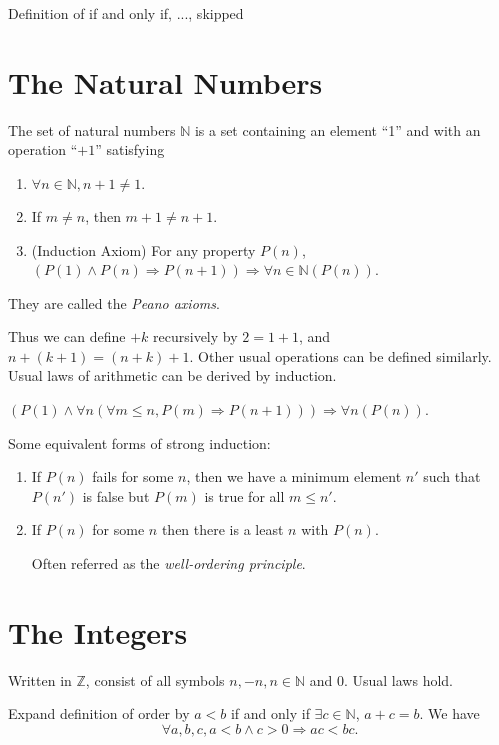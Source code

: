 \documentclass[10pt]{article}
\begin{document}
	Definition of if and only if, ..., skipped

	\section{The Natural Numbers}
	\begin{definition}
		The set of natural numbers $ \mathbb{N} $ is a set containing an element “1” and with an operation “$+1$” satisfying
		\begin{enumerate}[(1)]
			\item $ \forall n\in \mathbb{N}, n+1\neq 1. $
			\item If $ m\neq n $, then $ m+1\neq n+1. $ 
			\item (Induction Axiom) For any property $P(n)$, $ (P(1)\land P(n)\Rightarrow P(n+1)) \Rightarrow \forall n\in \mathbb{N} (P(n))$.
		\end{enumerate}
		They are called the \textit{Peano axioms}.
	\end{definition}
	Thus we can define $ +k $ recursively by $ 2=1+1 $, and $ n+(k+1)=(n+k)+1 $. Other usual operations can be defined similarly. Usual laws of arithmetic can be derived by induction.
	\begin{proposition}\label{prop:strong_induction}
		$(P(1) \land \forall n (\forall m\le n, P(m) \Rightarrow P(n+1))) \Rightarrow \forall n(P(n))$.
	\end{proposition}
	\begin{remark}
		Some equivalent forms of strong induction:
		\begin{enumerate}
			\item If $P(n)$ fails for some $n$, then we have a minimum element $n'$ such that $P(n')$ is false but $P(m)$ is true for all $m\le n'$.
			\item If $P(n)$ for some $n$ then there is a least $n$ with $P(n)$.

			Often referred as the \textit{well-ordering principle}.
		\end{enumerate}
	\end{remark}
	\section{The Integers}
	Written in $ \mathbb{Z} $, consist of all symbols $n,-n,n\in \mathbb{N}$ and 0. Usual laws hold.

	Expand definition of order by $ a<b $ if and only if $ \exists c\in \mathbb{N} $, $a+c=b$. We have
	\[
		\forall a,b,c, a<b \land c>0 \Longrightarrow ac<bc
	.\]
\end{document}
